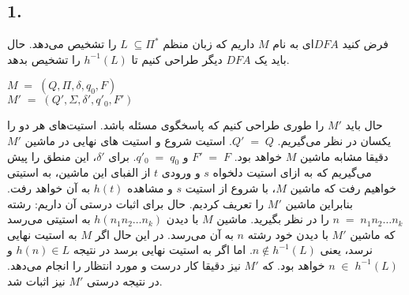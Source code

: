 \subsection*{1. }
فرض کنید $DFA$ای به نام $M$ داریم که زبان منظم $L\;\subseteq \Pi^*$ را تشخیص می‌دهد. حال باید یک $DFA$ دیگر طراحی کنیم تا $h^{-1}(L)$ را تشخیص بدهد.
\begin{center}
    $M\;=\;(Q,\Pi,\delta,q_0, F)$\\
    $M'\;=\;(Q', \Sigma, \delta', q'_0, F')$\\[0.1in]
\end{center}
حال باید $M'$ را طوری طراحی کنیم که پاسخگوی مسئله باشد. استیت‌های هر دو را یکسان در نظر می‌گیریم. $Q'\;=\;Q$.
\newline
استیت شروع و
استیت های نهایی در ماشین $M'$ دقیقا مشابه ماشین $M$ خواهد بود. $F'\;=\;F$ و 
$q'_0\;=\;q_0$.
\newline
برای $\delta'$، این منطق را پیش می‌گیریم که به ازای استیت دلخواه $s$ و ورودی $t$ از الفبای این ماشین، به استیتی خواهیم رفت که ماشین $M$، با شروع از استیت $s$ و مشاهده $h(t)$ به آن خواهد رفت.
\newline
بنابراین ماشین $M'$ را تعریف کردیم. حال برای اثبات درستی آن داریم:
\newline
رشته $n\;=\;n_1n_2\ldots n_k$ را در نظر بگیرید.
ماشین $M$ با دیدن $h(n_1n_2\ldots n_k)$ به استیتی می‌رسد که ماشین $M'$ با دیدن خود رشته $n$ به آن می‌رسد. در این حال اگر $M$ به استیت نهایی نرسد، یعنی $n\notin h^{-1}(L)$. اما اگر به استیت نهایی برسد در نتیجه $h(n)\in L$ و $n\; \in \; h^{-1}(L)$
خواهد بود. که $M'$ نیز دقیقا کار درست و مورد انتظار را انجام می‌دهد.\newline
در نتیجه درستی $M'$ نیز اثبات شد.

